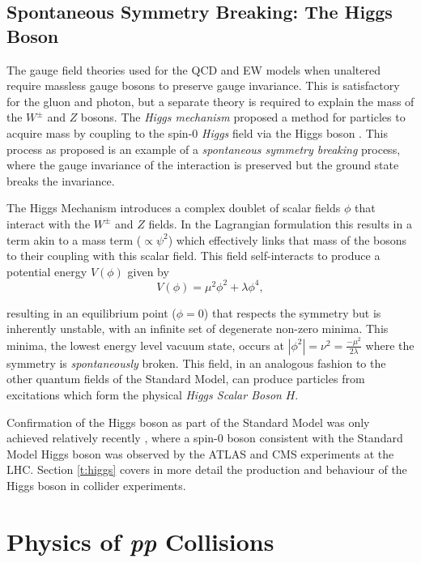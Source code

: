 	\subsection{Spontaneous Symmetry Breaking: The Higgs Boson}
	\label{t:symbreak}

	The gauge field theories used for the QCD and EW models when unaltered require massless gauge bosons to preserve gauge invariance. This is satisfactory for the gluon and photon, but a separate theory is required to explain the mass of the $W^\pm$ and $Z$ bosons. The \textit{Higgs mechanism} proposed a method for particles to acquire mass by coupling to the spin-$0$ \textit{Higgs} field via the Higgs boson \cite{gauge-boson-mass, higgs-1, higgs-2}. This process as proposed is an example of a \textit{spontaneous symmetry breaking} process, where the gauge invariance of the interaction is preserved but the ground state breaks the invariance.

	The Higgs Mechanism introduces a complex doublet of scalar fields $\phi$ that interact with the $W^\pm$ and $Z$ fields. In the Lagrangian formulation this results in a term akin to a mass term ($\propto\psi^2$) which effectively links that mass of the bosons to their coupling with this scalar field. This field self-interacts to produce a potential energy $V(\phi)$ given by
	 \begin{equation}
		 V(\phi) = \mu^2\phi^2 + \lambda\phi^4,
	 \end{equation}

	 	resulting in an equilibrium point ($\phi=0$) that respects the symmetry but is inherently unstable, with an infinite set of degenerate non-zero minima. This minima, the lowest energy level vacuum state, occurs at $|\phi^2|=\nu^2=\frac{-\mu^2}{2\lambda}$ where the symmetry is \textit{spontaneously} broken. This field, in an analogous fashion to the other quantum fields of the Standard Model, can produce particles from excitations which form the physical \textit{Higgs Scalar Boson} $H$.

	 Confirmation of the Higgs boson as part of the Standard Model was only achieved relatively recently \cite{higgs-atlas, higgs-cms}, where a spin-$0$ boson consistent with the Standard Model Higgs boson was observed by the ATLAS and CMS experiments at the LHC. Section \ref{t:higgs} covers in more detail the production and behaviour of the Higgs boson in collider experiments.


\section{Physics of \textit{pp} Collisions}

